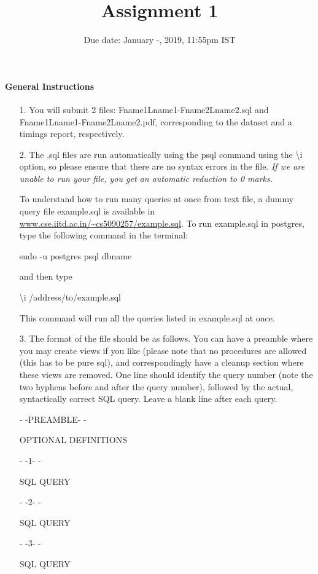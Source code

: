 \documentclass[10pt]{article}
\title{Assignment 1}
\date{Due date: January -, 2019, 11:55pm IST}
\begin{document}
\maketitle
\paragraph*{General Instructions}


\begin{itemize}

\item[1.]You will submit 2 files: Fname1Lname1-Fname2Lname2.sql and Fname1Lname1-Fname2Lname2.pdf, corresponding to the dataset and a timings report, respectively.

\item[2.]The .sql files are run automatically using the psql command using the \textbackslash i option, so please ensure that there are no syntax errors in the file. {\it If we are unable to run your file, you get an automatic reduction to 0 marks.}


To understand how to run many queries at once from text file, a dummy query file example.sql is available in 
\url{www.cse.iitd.ac.in/~cs5090257/example.sql}. To run example.sql in postgres, type the following command in the terminal:

sudo -u postgres psql dbname

and then type 

\textbackslash i /address/to/example.sql

This command will run all the queries listed in example.sql at once.  

\item[3.] The format of the file should be as follows. You can have a preamble where you may create views if you like (please note that no procedures are allowed (this has to be pure sql), and correspondingly have a cleanup section where these views are removed. One line should identify the query number (note the two hyphens before and after the query number), followed by the actual, syntactically correct SQL
query. Leave a blank line after each query. 

- -PREAMBLE- -

OPTIONAL DEFINITIONS

- -1- -

SQL QUERY

- -2- -

SQL QUERY

- -3- -

SQL QUERY


\end{itemize}
\end{document}
